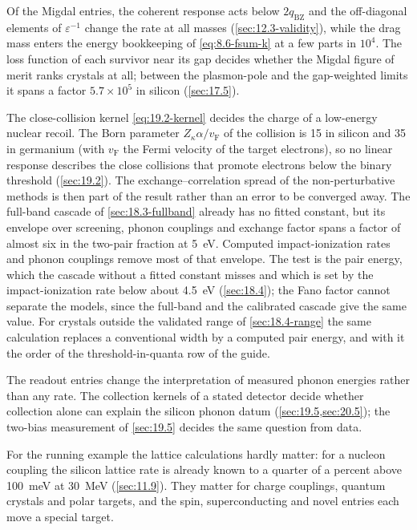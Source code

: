 Of the Migdal entries, the coherent response acts below $2q_{\mathrm{BZ}}$ and the off-diagonal elements of $\varepsilon^{-1}$ change the rate at all masses (\cref{sec:12.3-validity}), while the drag mass enters the energy bookkeeping of \cref{eq:8.6-fsum-k} at a few parts in $10^4$. The loss function of each survivor near its gap decides whether the Migdal figure of merit ranks crystals at all; between the plasmon-pole and the gap-weighted limits it spans a factor $5.7\times10^5$ in silicon (\cref{sec:17.5}).

The close-collision kernel \cref{eq:19.2-kernel} decides the charge of a low-energy nuclear recoil. The Born parameter $Z_\kappa\alpha/v_{\mathrm{F}}$ of the collision is 15 in silicon and 35 in germanium (with $v_{\mathrm{F}}$ the Fermi velocity of the target electrons), so no linear response describes the close collisions that promote electrons below the binary threshold (\cref{sec:19.2}). The exchange--correlation spread of the non-perturbative methods is then part of the result rather than an error to be converged away. The full-band cascade of \cref{sec:18.3-fullband} already has no fitted constant, but its envelope over screening, phonon couplings and exchange factor spans a factor of almost six in the two-pair fraction at \SI{5}{eV}. Computed impact-ionization rates and phonon couplings remove most of that envelope. The test is the pair energy, which the cascade without a fitted constant misses and which is set by the impact-ionization rate below about \SI{4.5}{eV} (\cref{sec:18.4}); the Fano factor cannot separate the models, since the full-band and the calibrated cascade give the same value. For crystals outside the validated range of \cref{sec:18.4-range} the same calculation replaces a conventional width by a computed pair energy, and with it the order of the threshold-in-quanta row of the guide.

The readout entries change the interpretation of measured phonon energies rather than any rate. The collection kernels of a stated detector decide whether collection alone can explain the silicon phonon datum (\cref{sec:19.5,sec:20.5}); the two-bias measurement of \cref{sec:19.5} decides the same question from data.

For the running example the lattice calculations hardly matter: for a nucleon coupling the silicon lattice rate is already known to a quarter of a percent above \SI{100}{meV} at \SI{30}{MeV} (\cref{sec:11.9}). They matter for charge couplings, quantum crystals and polar targets, and the spin, superconducting and novel entries each move a special target.

